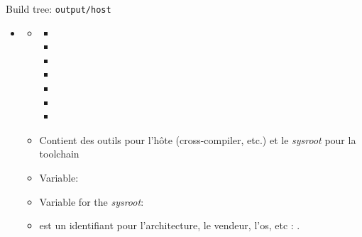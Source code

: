 \documentclass[aspectratio=169,obeyspaces,spaces,hyphens,dvipsnames]{beamer}
\begin{document}
\begin{frame}{Build tree: {\tt output/host}}
  \begin{itemize}
  \item {}
    \begin{itemize}
    \item {}
      \begin{itemize}
        \tiny
      \item {}
      \item {}
      \item {}
        \vspace{0.2cm}
      \item {}
      \item {}
      \item {}
      \item {}
      \end{itemize}
    \item Contient des outils pour l'hôte (cross-compiler, etc.) et le
      {\em sysroot} pour la toolchain
    \item Variable: 
    \item Variable for the {\em sysroot}: 
    \item {} est un identifiant pour l'architecture, le vendeur,
      l'os, etc : .
    \end{itemize}
  \end{itemize}
\end{frame}
\end{document}
